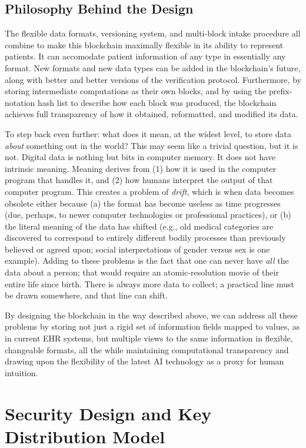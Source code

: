 \documentclass[12pt]{article}
\begin{document}
\subsection{Philosophy Behind the Design}
The flexible data formats, versioning system, and multi-block intake procedure all combine to make this blockchain maximally flexible in its ability to represent patients. It can accomodate patient information of any type in essentially any format. New formats and new data types can be added in the blockchain's future, along with better and better versions of the verification protocol. Furthermore, by storing intermediate computations as their own blocks, and by using the prefix-notation hash list to describe how each block was produced, the blockchain achieves full transparency of how it obtained, reformatted, and modified its data.

To step back even further: what does it mean, at the widest level, to store data {\em about} something out in the world? This may seem like a trivial question, but it is not. Digital data is nothing but bits in computer memory. It does not have intrinsic meaning. Meaning derives from (1) how it is used in the computer program that handles it, and (2) how humans interpret the output of that computer program. This creates a problem of {\em drift}, which is when data becomes obsolete either because (a) the format has become useless as time progresses (due, perhaps, to newer computer technologies or professional practices), or (b) the literal meaning of the data has shifted (e.g., old medical categories are discovered to correspond to entirely different bodily processes than previously believed or agreed upon; social interpretations of gender versus sex is one example). Adding to these problems is the fact that one can never have {\em all} the data about a person; that would require an atomic-resolution movie of their entire life since birth. There is always more data to collect; a practical line must be drawn somewhere, and that line can shift.

By designing the blockchain in the way described above, we can address all these problems by storing not just a rigid set of information fields mapped to values, as in current EHR systems, but multiple views to the same information in flexible, changeable formats, all the while maintaining computational transparency and drawing upon the flexibility of the latest AI technology as a proxy for human intuition.



\section{Security Design and Key Distribution Model}
\end{document}
